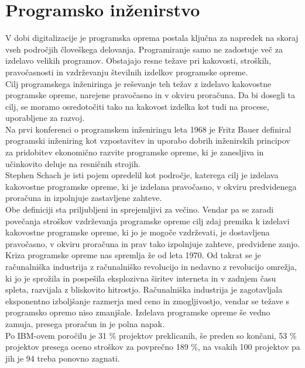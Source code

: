 \documentclass[a4paper,12pt,openright]{book}
\begin{document}
\section{Programsko inženirstvo} \label{chap:prog-inz}
V dobi digitalizacije je programska oprema postala ključna za napredek na skoraj vseh področjih človeškega delovanja. Programiranje samo ne zadostuje več za izdelavo velikih programov. Obstajajo resne težave pri kakovosti, stroških, pravočasnosti in vzdrževanju številnih izdelkov programske opreme.\\
Cilj programskega inženiringa je reševanje teh težav z izdelavo kakovostne programske opreme, narejene pravočasno in v okviru proračuna. Da bi dosegli ta cilj, se moramo osredotočiti tako na kakovost izdelka kot tudi na procese, uporabljene za razvoj.\cite{aggarwal2005software} \\
Na prvi konferenci o programskem inženiringu leta 1968 je Fritz Bauer \cite{randell19961968} definiral programski inženiring kot vzpostavitev in uporabo dobrih inženirskih principov za pridobitev ekonomično razvite programske opreme, ki je zanesljiva in učinkovito deluje na resničnih strojih. \\
Stephen Schach je isti pojem opredelil kot področje, katerega cilj je izdelava kakovostne programske opreme, ki je izdelana pravočasno, v okviru predvidenega proračuna in izpolnjuje zastavljene zahteve.\cite{randell19961968} \\ Obe definiciji sta priljubljeni in sprejemljivi za večino. Vendar pa se zaradi povečanja stroškov vzdrževanja programske opreme cilj zdaj premika k izdelavi kakovostne programske opreme, ki jo je mogoče vzdrževati, je dostavljena pravočasno, v okviru proračuna in prav tako izpolnjuje zahteve, predvidene zanjo. \\
\sloppy
Kriza programske opreme nas spremlja že od leta 1970. Od takrat se je računalniška industrija z računalniško revolucijo in nedavno z revolucijo omrežja, ki jo je sprožila in  pospešila eksplozivna širitev interneta in v zadnjem času spleta, razvijala z bliskovito hitrostjo.
Računalniška industrija je zagotavljala eksponentno izboljšanje razmerja med ceno in zmogljivostjo, vendar se težave s programsko opremo niso zmanjšale. Izdelava programske opreme še vedno zamuja, presega proračun in je polna napak. \cite{aggarwal2005software} \\
Po IBM-ovem poročilu je 31 \% projektov preklicanih, še preden so končani, 53 \% projektov presega oceno stroškov za povprečno 189 \%, na vsakih 100 projektov pa jih je 94 treba ponovno zagnati. \cite{boehm2006view}
\end{document}
